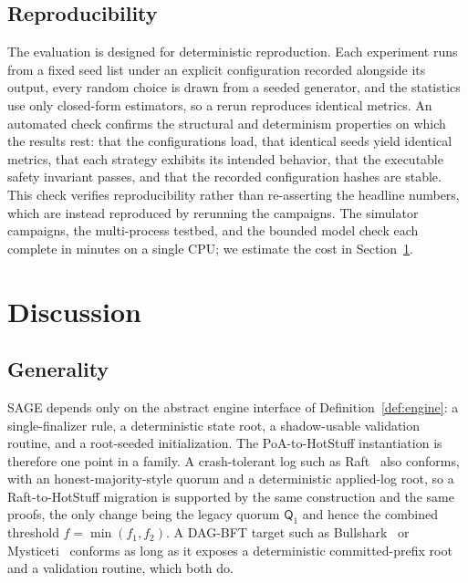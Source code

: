\documentclass[journal]{IEEEtran}
\begin{document}
\subsection{Reproducibility}
The evaluation is designed for deterministic reproduction. Each experiment runs from a fixed seed
list under an explicit configuration recorded alongside its output, every random choice is drawn
from a seeded generator, and the statistics use only closed-form estimators, so a rerun reproduces
identical metrics. An automated check confirms the structural and determinism properties on which
the results rest: that the configurations load, that identical seeds yield identical metrics, that
each strategy exhibits its intended behavior, that the executable safety invariant passes, and
that the recorded configuration hashes are stable. This check verifies reproducibility rather than
re-asserting the headline numbers, which are instead reproduced by rerunning the campaigns. The
simulator campaigns, the multi-process testbed, and the bounded model check each complete in
minutes on a single CPU; we estimate the cost in Section~\ref{sec:discussion}.

\section{Discussion}
\label{sec:discussion}

\subsection{Generality}
SAGE depends only on the abstract engine interface of Definition~\ref{def:engine}: a
single-finalizer rule, a deterministic state root, a shadow-usable validation routine, and a
root-seeded initialization. The PoA-to-HotStuff instantiation is therefore one point in a
family. A crash-tolerant log such as Raft~\cite{raft} also conforms, with an
honest-majority-style quorum and a deterministic applied-log root, so a Raft-to-HotStuff
migration is supported by the same construction and the same proofs, the only change being the
legacy quorum $\mathsf{Q}_1$ and hence the combined threshold $f=\min(f_1,f_2)$. A
DAG-BFT target such as Bullshark~\cite{bullshark} or Mysticeti~\cite{mysticeti} conforms as long
as it exposes a deterministic committed-prefix root and a validation routine, which both do.
\end{document}
